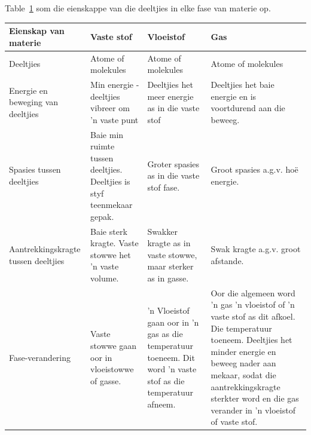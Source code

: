       \label{m38730*id308767}Table~\ref{tab:microscopic:kinetic theory} som die eienskappe van die deeltjies in elke fase van materie op. 
\begin{table}[H]
\begin{center}

\begin{tabular}{|p{3cm}|p{3cm}|p{3cm}|p{3cm}|}\hline
\textbf{Eienskap van materie} & \textbf{Vaste stof} & \textbf{Vloeistof} & \textbf{Gas} \\\hline
Deeltjies & Atome of molekules & Atome of molekules & Atome of molekules \\\hline
Energie en beweging van deeltjies & Min energie - deeltjies vibreer om 'n vaste punt & Deeltjies het meer energie as in die vaste stof & Deeltjies het baie energie en is voortdurend aan die beweeg.  \\\hline
Spasies tussen  deeltjies & Baie min ruimte tussen deeltjies. Deeltjies is styf teenmekaar gepak. & Groter spasies as in die vaste stof fase. & Groot spasies a.g.v. ho\"{e} energie.  \\\hline
Aantrekkingskragte tussen deeltjies & Baie sterk kragte. Vaste stowwe het  'n vaste volume. & Swakker kragte as in vaste stowwe, maar sterker as in gasse. & Swak kragte a.g.v. groot afstande. \\\hline
Fase-verandering & Vaste stowwe gaan oor in vloeistowwe of gasse. & 'n Vloeistof gaan oor in 'n gas as die temperatuur toeneem. Dit word 'n vaste stof as die temperatuur afneem. & Oor die algemeen word 'n gas 'n vloeistof of 'n vaste stof as dit afkoel. Die temperatuur toeneem. Deeltjies het minder energie en beweeg nader aan mekaar, sodat die aantrekkingskragte sterkter word en die gas verander in  'n vloeistof of vaste stof.  \\\hline
\end{tabular}
\label{tab:microscopic:kinetic theory}
\end{center}
\end{table}
    
